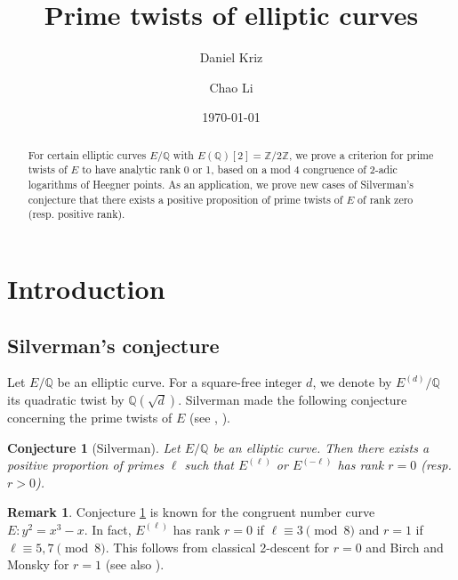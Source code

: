 \documentclass[11pt]{amsart}
\title{Prime twists of elliptic curves}
\newtheorem{conjecture}[theorem]{Conjecture}
\theoremstyle{definition}
\newtheorem{remark}[theorem]{Remark}
\begin{document}
\author[Daniel Kriz]{Daniel Kriz}
\address{Department of Mathematics, Princeton University, Fine Hall, Washington Rd, Princeton, NJ 08544}
\author[Chao Li]{Chao Li} 
\address{Department of Mathematics, Columbia University, 2990 Broadway,
 New York, NY 10027}


\date{\today}

\maketitle

\begin{abstract}
For certain elliptic curves $E/\mathbb{Q}$ with $E(\mathbb{Q})[2]=\mathbb{Z}/2 \mathbb{Z}$, we prove a criterion for prime twists of $E$ to have analytic rank 0 or 1, based on a mod 4 congruence of 2-adic logarithms of Heegner points. As an application, we prove new cases of Silverman's conjecture that there exists a positive proposition of prime twists of $E$ of rank zero (resp. positive rank).
\end{abstract}

\setcounter{tocdepth}{1}

\section{Introduction}

\subsection{Silverman's conjecture}

Let $E/\mathbb{Q}$ be an elliptic curve. For a square-free integer $d$, we denote by $E^{(d)}/\mathbb{Q}$ its quadratic twist by $\mathbb{Q}(\sqrt{d})$. Silverman made the following conjecture concerning the prime twists of $E$ (see \cite[p.653]{Ono1998}, \cite[p.350]{Ono1997}).

\begin{conjecture}[Silverman]\label{conj:silverman}
  Let $E/\mathbb{Q}$ be an elliptic curve. Then there exists a positive proportion of primes $\ell$ such that $E^{(\ell)}$ or $E^{(-\ell)}$ has rank $r=0$ (resp. $r>0$).
\end{conjecture}

\begin{remark}
Conjecture \ref{conj:silverman} is known for the congruent number curve $E: y^2=x^3-x$. In fact, $E^{(\ell)}$ has rank $r=0$ if $\ell\equiv3\pmod{8}$ and $r=1$ if $\ell\equiv 5,7\pmod{8}$. This follows from classical 2-descent for $r=0$ and Birch \cite{Birch1970} and Monsky \cite{Monsky1990} for $r=1$ (see also \cite{Stephens1975}).
\end{remark}
\end{document}
